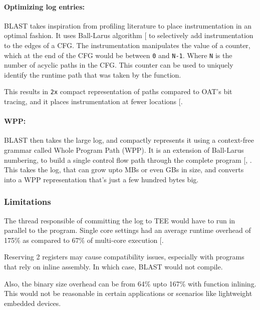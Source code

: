 \documentclass[a4paper, nobind]{templates/ociamthesis}
\begin{document}
\paragraph{Optimizing log entries:}\label{optimizing-log-entries}

BLAST takes inspiration from profiling literature to place instrumentation in
an optimal fashion. It uses Ball-Larus algorithm {[}\citeproc{ref-balllarus}{17}{]} to selectively
add instrumentation to the edges of a CFG. The instrumentation manipulates the value of a counter,
which at the end of the CFG would be between \texttt{0} and \texttt{N-1}. Where \texttt{N} is the number
of acyclic paths in the CFG. This counter can be used to uniquely identify the
runtime path that was taken by the function.

This results in \texttt{2x} compact representation of paths compared to OAT's bit tracing,
and it places instrumentation at fewer locations {[}\citeproc{ref-blast}{55}{]}.

\paragraph{WPP:}\label{wpp}

BLAST then takes the large log, and compactly represents it using a context-free
grammar called Whole Program Path (WPP). It is an extension of Ball-Larus numbering, to build a single
control flow path through the complete program {[}, \citeproc{ref-blast}{55}{]}.
This takes the log, that can grow upto MBs or even GBs in size, and converts into
a WPP representation that's just a few hundred bytes big.

\subsubsection{Limitations}\label{limitations}

The thread responsible of committing the log to TEE would have to run in parallel
to the program. Single core settings had an average runtime overhead of 175\%
as compared to 67\% of multi-core execution {[}\citeproc{ref-blast}{55}{]}.

Reserving 2 registers may cause compatibility issues, especially with programs
that rely on inline assembly. In which case, BLAST would not compile.

Also, the binary size overhead can be from 64\% upto 167\% with function inlining.
This would not be reasonable in certain applications or scenarios like lightweight embedded devices.
\end{document}
